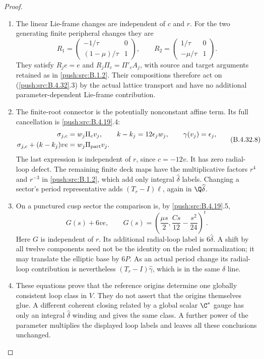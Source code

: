 \begin{proof}
\begin{enumerate}[label=\arabic*.,leftmargin=*]
\item The linear Lie-frame changes are independent of $c$ and $r$.
For the two generating finite peripheral changes they are
\[
 R_1=
 \begin{pmatrix}-1/\tau&0\\(1-\mu)/\tau&1\end{pmatrix},
 \qquad
 R_2=
 \begin{pmatrix}1/\tau&0\\-\mu/\tau&1\end{pmatrix}.
 \tag{B.4.32.7}
\]
They satisfy $R_je=e$ and $R_j\Pi_c=\Pi'_cA_j$, with
source and target arguments retained as in \ref{push:src:B.1.2}. Their
compositions therefore act on (\ref{push:src:B.4.32}.3) by the actual lattice
transport and have no additional parameter-dependent
Lie-frame contribution.

\item The finite-root connector is the potentially nonconstant
affine term. Its full cancellation is \ref{push:src:B.4.19}.4:
\[
 \begin{split}
  \sigma_{j,c}&=w_j\Pi_c v_j,\qquad
   k-k_j=12\epsilon_jw_j,\qquad
   \gamma(v_j)=\epsilon_j,\\
  \sigma_{j,c}+(k-k_j)ve
     &=w_j\Pi_{\rm part}v_j .
 \end{split}
 \tag{B.4.32.8}
\]
The last expression is independent of $r$, since $c=-12v$.
It has zero radial-loop defect. The remaining finite deck
maps have the multiplicative factors $r^4$ and $r^{-3}$
in \ref{push:src:B.1.2}, which add only integral $\widehat\delta$ labels.
Changing a sector's period representative adds
$(T_r-I)\ell$, again in $\Q\widehat\delta$.

\item On a punctured cusp sector the comparison is, by \ref{push:src:B.4.19}.5,
\[
 G(s)+6ve,\qquad
 G(s)=\left(\frac{\mu s}{2},
                 \frac{Cs}{12}-\frac{s^2}{24}\right)^t .
 \tag{B.4.32.9}
\]
Here $G$ is independent of $r$. Its additional radial-loop
label is $6\widehat\delta$. A shift by all twelve components
need not be the identity on the ruled normalization; it may
translate the elliptic base by $6P$. As an actual period
change its radial-loop contribution is nevertheless
$(T_r-I)\widehat\gamma$, which is in the same $\delta$ line.

\item These equations prove that the reference origins determine one
globally consistent loop class in $V$. They do not assert that
the origins themselves glue. A different coherent closing
related by a global scalar $\C^*$ gauge has only an integral
$\widehat\delta$ winding and gives the same class. A further
power of the parameter multiplies the displayed loop labels
and leaves all these conclusions unchanged.


\end{enumerate}
\end{proof}
